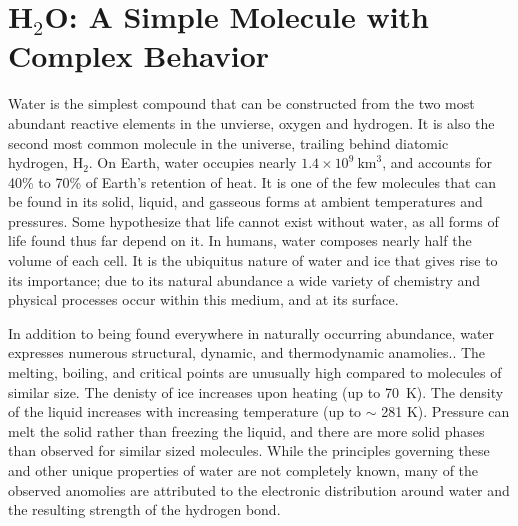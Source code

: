 \section{H$_2$O: A Simple Molecule with Complex Behavior}
Water is the simplest compound that can be constructed from the two
most abundant reactive elements in the unvierse, oxygen and
hydrogen. It is also the second most common molecule in the universe,
trailing behind diatomic hydrogen, $\mathrm{H}_2$.  On Earth, water
occupies nearly $1.4\times 10^{9}~\mathrm{km}^{3}$\cite{Brown2016},
and accounts for 40\% to 70\% of Earth's retention of heat. It is one
of the few molecules that can be found in its solid, liquid, and
gasseous forms at ambient temperatures and pressures.  Some
hypothesize that life cannot exist without water, as all forms of life
found thus far depend on it.\cite{Caldecott2008,Henry2005} In humans,
water composes nearly half the volume of each cell.\cite{Ling2004} It
is the ubiquitus nature of water and ice that gives rise to its
importance; due to its natural abundance a wide variety of chemistry
and physical processes occur within this medium, and at its surface.

In addition to being found everywhere in naturally occurring
abundance, water expresses numerous structural, dynamic, and
thermodynamic anamolies.\cite{Brovchenko2008}. The melting, boiling,
and critical points are unusually high compared to molecules of
similar size. The denisty of ice increases upon heating (up to
70~K). The density of the liquid increases with increasing temperature
(up to $\sim$ 281 K). Pressure can melt the solid rather than freezing
the liquid, and there are more solid phases than observed for similar
sized molecules. While the principles governing these and other unique
properties of water are not completely known, many of the observed
anomolies are attributed to the electronic distribution around water
and the resulting strength of the hydrogen bond.


